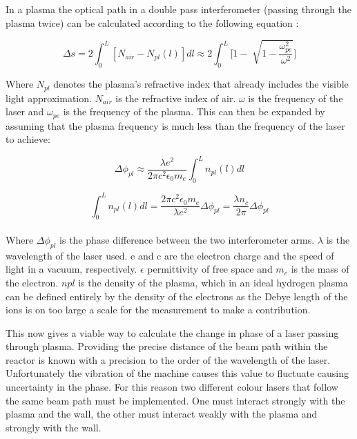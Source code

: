 \documentclass[12pt,a4paper,oneside]{report}
\begin{document}
In a plasma the optical path in a double pass interferometer (passing through the plasma twice) can be calculated according to the following equation \cite[p.~26]{Brunner2017} :

\begin{equation}
	\Delta s = 2 \int_{0}^{L} [N_{air} - N_{pl}(l)]dl \approx 2 \int_{0}^{L} \Bigg[1 - \sqrt[]{1-\frac{\omega_{pe}^{2}}{\omega^{2}}}\Bigg]
	\label{eq:opticalpathint}
\end{equation}

Where $N_{pl}$ denotes the plasma's refractive index that already includes the visible light approximation. $N_{air}$ is the refractive index of air. $\omega$ is the frequency of the laser and $\omega_{pe}$ is the frequency of the plasma. This can then be expanded by assuming that the plasma frequency is much less than the frequency of the laser to achieve:

\begin{equation}
	\Delta\phi_{pl} \approx \frac{\lambda e^{2}}{2 \pi c^{2} \epsilon_{0} m_{e}} \int_{0}^{L} n_{pl} (l) dl
	\label{eq:plasmaphase}
\end{equation}

\begin{equation}
	\int_{0}^{L} n_{pl} (l) dl = \frac{2 \pi c^{2} \epsilon_{0} m_{e}}{\lambda e^{2}} \Delta\phi_{pl} = \frac{\lambda n_{c}}{2 \pi} \Delta\phi_{pl}
	\label{eq:phaseintegral}
\end{equation}
\\
Where $\Delta\phi_{pl}$ is the phase difference between the two interferometer arms. $\lambda$ is the wavelength of the laser used. e and c are the electron charge and the speed of light in a vacuum, respectively. $\epsilon$ permittivity of free space and $m_{e}$ is the mass of the electron. $n{pl}$ is the density of the plasma, which in an ideal hydrogen plasma can be defined entirely by the density of the electrons as the Debye length of the ions is on too large a scale for the measurement to make a contribution. 

This now gives a viable way to calculate the change in phase of a laser passing through plasma. Providing the precise distance of the beam path within the reactor is known with a precision to the order of the wavelength of the laser. Unfortunately the vibration of the machine causes this value to fluctuate causing uncertainty in the phase. For this reason two different colour lasers that follow the same beam path must be implemented. One must interact strongly with the plasma and the wall, the other must interact weakly with the plasma and strongly with the wall.
\end{document}
